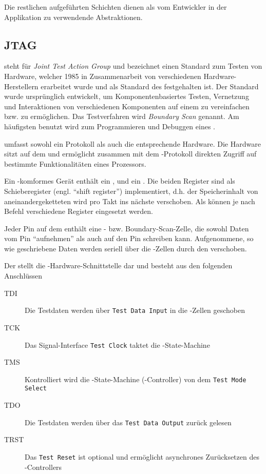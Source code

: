     Die restlichen aufgeführten Schichten dienen als vom Entwickler in der Applikation zu verwendende Abstraktionen.

	\subsection{JTAG}
	\label{sec:jtag}
	 steht für \textit{Joint Test Action Group} und bezeichnet einen Standard zum Testen von Hardware, welcher 1985
	in Zusammenarbeit von verschiedenen Hardware-Herstellern erarbeitet wurde und als Standard des  festgehalten ist.
	Der Standard wurde ursprünglich entwickelt, um Komponentenbasiertes Testen, Vernetzung und Interaktionen von
	verschiedenen Komponenten auf einem  zu vereinfachen bzw. zu ermöglichen\citep[vgl.~Kap.~2]{Rath2005}.
	Das Testverfahren wird \textit{Boundary Scan} genannt.
	Am häufigsten benutzt wird  zum Programmieren und Debuggen eines .

     umfasst sowohl ein Protokoll als auch die entsprechende Hardware. Die Hardware sitzt auf dem  und ermöglicht
    zusammen mit dem -Protokoll direkten Zugriff auf bestimmte Funktionalitäten eines Prozessors.

    Ein -komformes Gerät enthält ein ,  und
    ein . Die beiden Register sind als Schieberegister
    (engl. ``shift register'') implementiert, d.h. der Speicherinhalt von aneinandergeketteten  wird
    pro Takt ins nächste  verschoben.
    Als  können je nach Befehl verschiedene Register eingesetzt werden.

    Jeder Pin auf dem  enthält eine - bzw. Boundary-Scan-Zelle, die sowohl Daten vom Pin ``aufnehmen'' als auch
    auf den Pin schreiben kann. Aufgenommene, so wie geschriebene Daten werden seriell über die -Zellen durch den
     verschoben\citep[]{Corelis}.

    Der  stellt die -Hardware-Schnittstelle dar und besteht aus den folgenden Anschlüssen
    \begin{description}
        \item[TDI] Die Testdaten werden über \texttt{Test Data Input} in die -Zellen geschoben
        \item[TCK] Das Signal-Interface \texttt{Test Clock} taktet die -State-Machine
        \item[TMS] Kontrolliert wird die -State-Machine (-Controller) von dem \texttt{Test Mode Select}
        \item[TDO] Die Testdaten werden über das \texttt{Test Data Output} zurück gelesen
        \item[TRST] Das \texttt{Test Reset} ist optional und ermöglicht asynchrones Zurücksetzen des -Controllers
    \end{description}

